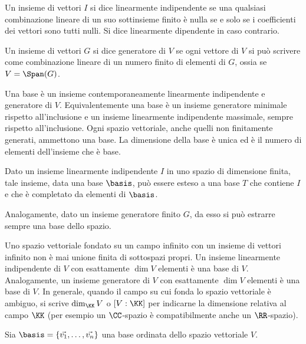 \documentclass[10pt,landscape]{article}
\begin{document}
\begin{multicols}{3}
		Un insieme di vettori $I$ si dice linearmente indipendente se
		una qualsiasi combinazione lineare di un suo sottinsieme
		finito è nulla se e solo se i coefficienti dei vettori
		sono tutti nulli. Si dice linearmente dipendente in caso
		contrario.
		
		Un insieme di vettori $G$ si dice generatore di $V$ se ogni vettore
		di $V$ si può scrivere come combinazione lineare di un numero
		finito di elementi di $G$, ossia se $V = \Span(G)$.
		
		Una base è un insieme contemporaneamente linearmente indipendente
		e generatore di $V$. Equivalentemente una base è un insieme generatore
		minimale rispetto all'inclusione e un insieme linearmente indipendente
		massimale, sempre rispetto all'inclusione. Ogni spazio vettoriale,
		anche quelli non finitamente generati,
		ammettono una base. La dimensione della base è unica ed è il
		numero di elementi dell'insieme che è base.
		
		Dato un insieme linearmente indipendente $I$ in uno spazio di dimensione
		finita, tale insieme, data una base $\basis$, può essere esteso
		a una base $T$ che contiene $I$ e che è completato da
		elementi di $\basis$.
		
		Analogamente, dato un insieme generatore finito $G$, da esso
		si può estrarre sempre una base dello spazio.
		
		Uno spazio vettoriale fondato su un campo infinito
		con un insieme di vettori infinito non
		è mai unione finita di sottospazi propri. Un insieme linearmente
		indipendente di $V$ con esattamente $\dim V$ elementi è una
		base di $V$. Analogamente, un insieme generatore di $V$ con esattamente
		$\dim V$ elementi è una base di $V$. In generale, quando il campo su
		cui fonda lo spazio vettoriale è ambiguo, si scrive $\dim_\KK V$ o $[V : \KK]$
		per indicarne la dimensione relativa al campo $\KK$ (per esempio un $\CC$-spazio è
		compatibilmente anche un $\RR$-spazio).
		
		Sia $\basis = \{\vec{v_1}, \ldots, \vec{v_n}\}$ una base ordinata dello spazio vettoriale $V$.
		

\end{multicols}
\end{document}
